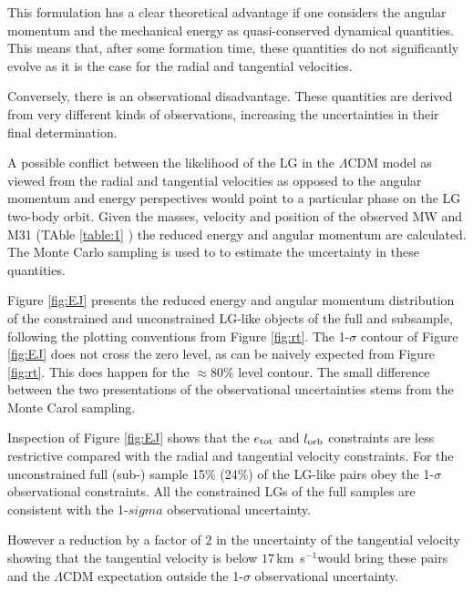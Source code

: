 \documentclass{emulateapj}
\newcommand{\kms}{\,km~s$^{-1}$}
\begin{document}
This formulation has a clear theoretical advantage if one considers
the angular momentum and the mechanical energy as quasi-conserved
dynamical quantities. This means that, after some formation time,
these quantities do not significantly evolve as it is the case for the
radial and tangential velocities.  

Conversely, there is an observational disadvantage. These quantities
are derived from very different kinds of observations, increasing the
uncertainties in their final determination. 

A possible conflict between the likelihood of the LG in the
$\Lambda$CDM model as viewed from the radial and tangential velocities
as opposed to the angular momentum and energy perspectives would point
to a particular phase on the LG two-body orbit. Given the masses,
velocity and position of the observed MW and M31 (TAble \ref{table:1}
) the reduced energy and angular momentum are calculated. The Monte
Carlo sampling is used to to estimate the uncertainty in these
quantities.  


Figure \ref{fig:EJ} presents the reduced  energy and angular momentum
distribution of the constrained and unconstrained LG-like  objects of
the full and subsample, following the   plotting conventions from
Figure \ref{fig:rt}.  The  1-$\sigma$ contour of Figure \ref{fig:EJ}
does not cross the zero level, as can be naively expected from Figure
\ref{fig:rt}. This does happen for the $\approx 80\%$ level
contour. The small difference between the two presentations of the
observational uncertainties stems from the Monte Carol sampling.  

Inspection of Figure \ref{fig:EJ}  shows that the $e_{\rm tot}$  and
$l_{\rm orb}$ constraints are less restrictive compared with the
radial and tangential velocity constraints. For the unconstrained full
(sub-) sample 15\% (24\%)  of the LG-like pairs obey the 1-$\sigma$
observational constraints. All the constrained LGs of the full
samples are consistent with the 1-$sigma$ observational uncertainty. 

However a reduction by a factor of $2$ in the uncertainty of the tangential velocity showing that the tangential velocity is below $17$\kms would 
bring these pairs and the $\Lambda$CDM expectation outside the
1-$\sigma$ observational uncertainty. 
\end{document}

